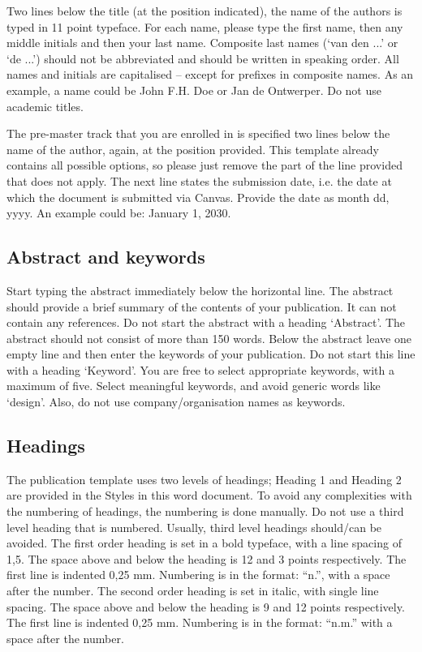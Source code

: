 \documentclass{paper}
\begin{document}
Two lines below the title (at the position indicated), the name of the authors is typed in 11 point typeface.
For each name, please type the first name, then any middle initials and then your last name.
Composite last names (‘van den ...’ or ‘de ...’) should not be abbreviated and should be written in speaking order.
All names and initials are capitalised – except for prefixes in composite names.
As an example, a name could be John F.H. Doe or Jan de Ontwerper.
Do not use academic titles.

The pre-master track that you are enrolled in is specified two lines below the name of the author, again, at the position provided.
This template already contains all possible options, so please just remove the part of the line provided that does not apply.
The next line states the submission date, i.e. the date at which the document is submitted via Canvas.
Provide the date as month dd, yyyy.
An example could be: January 1, 2030.

\subsection{Abstract and keywords}

Start typing the abstract immediately below the horizontal line.
The abstract should provide a brief summary of the contents of your publication.
It can not contain any references.
Do not start the abstract with a heading ‘Abstract’.
The abstract should not consist of more than 150 words.
Below the abstract leave one empty line and then enter the keywords of your publication.
Do not start this line with a heading ‘Keyword’.
You are free to select appropriate keywords, with a maximum of five.
Select meaningful keywords, and avoid generic words like ‘design’.
Also, do not use company/organisation names as keywords.

\subsection{Headings}

The publication template uses two levels of headings; Heading 1 and Heading 2 are provided in the Styles in this word document.
To avoid any complexities with the numbering of headings, the numbering is done manually.
Do not use a third level heading that is numbered.
Usually, third level headings should/can be avoided.
The first order heading is set in a bold typeface, with a line spacing of 1,5.
The space above and below the heading is 12 and 3 points respectively.
The first line is indented 0,25 mm.
Numbering is in the format: “n.”, with a space after the number.
The second order heading is set in italic, with single line spacing.
The space above and below the heading is 9 and 12 points respectively.
The first line is indented 0,25 mm.
Numbering is in the format: “n.m.” with a space after the number.
\end{document}
